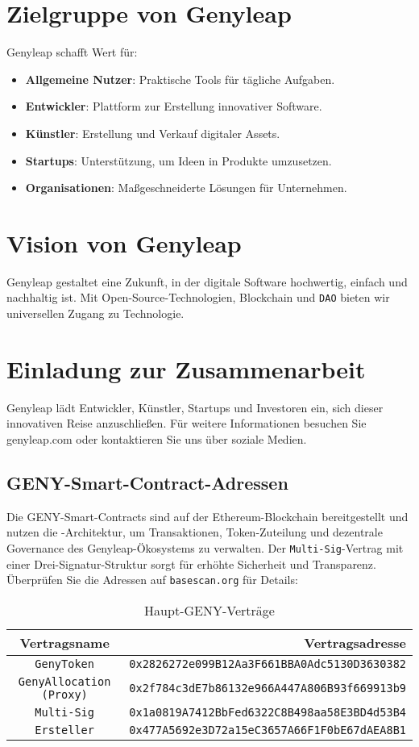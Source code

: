 \documentclass[a4paper,12pt,openany]{book}
\begin{document}
\chapter{Zielgruppe von Genyleap}
Genyleap schafft Wert für:
\begin{itemize}
    \item \textbf{Allgemeine Nutzer}: Praktische Tools für tägliche Aufgaben.
    \item \textbf{Entwickler}: Plattform zur Erstellung innovativer Software.
    \item \textbf{Künstler}: Erstellung und Verkauf digitaler Assets.
    \item \textbf{Startups}: Unterstützung, um Ideen in Produkte umzusetzen.
    \item \textbf{Organisationen}: Maßgeschneiderte Lösungen für Unternehmen.
\end{itemize}

\chapter{Vision von Genyleap}
Genyleap gestaltet eine Zukunft, in der digitale Software hochwertig, einfach und nachhaltig ist. Mit Open-Source-Technologien, Blockchain und \texttt{DAO} bieten wir universellen Zugang zu Technologie.

\chapter{Einladung zur Zusammenarbeit}
Genyleap lädt Entwickler, Künstler, Startups und Investoren ein, sich dieser innovativen Reise anzuschließen. Für weitere Informationen besuchen Sie genyleap.com oder kontaktieren Sie uns über soziale Medien.

\section*{GENY-Smart-Contract-Adressen}
Die GENY-Smart-Contracts sind auf der Ethereum-Blockchain bereitgestellt und nutzen die -Architektur, um Transaktionen, Token-Zuteilung und dezentrale Governance des Genyleap-Ökosystems zu verwalten. Der \texttt{Multi-Sig}-Vertrag mit einer Drei-Signatur-Struktur sorgt für erhöhte Sicherheit und Transparenz. Überprüfen Sie die Adressen auf \texttt{basescan.org} für Details:

\begin{table}[h]
\centering
\caption*{Haupt-GENY-Verträge}
\small
\begin{tabular}{c r}
\hline
\textbf{Vertragsname} & \textbf{Vertragsadresse} \\
\hline
\texttt{GenyToken} & {\texttt{0x2826272e099B12Aa3F661BBA0Adc5130D3630382}} \\
\texttt{GenyAllocation (Proxy)} & {\texttt{0x2f784c3dE7b86132e966A447A806B93f669913b9}} \\
\texttt{Multi-Sig} & {\texttt{0x1a0819A7412BbFed6322C8B498aa58E3BD4d53B4}} \\
\texttt{Ersteller} & {\texttt{0x477A5692e3D72a15eC3657A66F1F0bE67dAEA8B1}} \\
\hline
\end{tabular}
\end{table}
\end{document}
